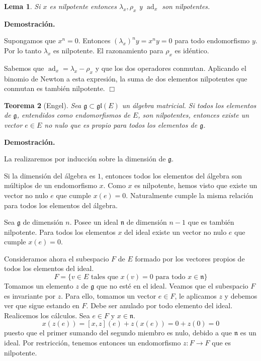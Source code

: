 \documentclass[a4paper,draft,12pt]{article}
\newtheorem{teo}{Teorema}[section]%
\newtheorem{lema}[teo]{Lema}%
\newcommand{\dem}{\noindent \textbf{Demostración. }\vspace{0.3 cm}}%
\newcommand{\g}{\mathfrak{g}}%
\newcommand{\fin}{ $\Box $ \vspace{0.4 cm}}
\DeclareMathOperator{\ad}{ad}  %
\begin{document}
\begin{lema}

Si $x$ es nilpotente entonces $\lambda_x, \rho_x$ y $ \ad_x$ son nilpotentes.

\end{lema}

\dem

Supongamos que $x^n=0$.  Entonces $(\lambda_x)^ny = x^ny =0$ para todo endomorfismo $y$.  Por lo tanto $\lambda_x$ es nilpotente.  El razonamiento para $\rho_x$ es idéntico.

Sabemos que $\ad_x = \lambda_x-\rho_x$ y que los dos operadores conmutan.  Aplicando el binomio de Newton a esta expresión, la suma de dos elementos nilpotentes que conmutan es también nilpotente. \fin

\begin{teo}[Engel]

Sea $\g \subset \mathfrak{gl}(E)$ un álgebra matricial.  Si todos los elementos de $\g$, entendidos como endomorfismos de $E$, son nilpotentes, entonces existe un vector $e  \in E$ no nulo que es propio para todos los elementos de $\g$.

\end{teo}


\dem

La realizaremos por inducción sobre la dimensión de $\g$.

Si la dimensión del álgebra es $1$, entonces todos los elementos del álgebra son múltiplos de un endomorfismo $x$.  Como $x$ es nilpotente, hemos visto que existe un vector no nulo $e$ que cumple $x(e)=0$.  Naturalmente cumple la misma relación para todos los elementos del álgebra.

Sea $\g$ de dimensión $n$.  Posee un ideal $\mathfrak{n}$ de dimensión $n-1$ que es también nilpotente.  Para todos los elementos $x$ del ideal existe un vector no nulo $e$ que cumple $x(e)=0$.  

Consideramos ahora el subespacio $F$ de $E$ formado por los vectores propios de todos los elementos del ideal.
$$
F= \{v \in E \text{ tales que } x(v)=0 \text{ para todo } x \in \mathfrak{n}\}
$$
Tomamos un elemento $z$ de $\g$ que no esté en el ideal.  Veamos que el subespacio $F$ es invariante por $z$.  Para ello, tomamos un vector $e \in F$, le aplicamos $z$ y debemos ver que sigue estando en $F$.  Debe ser  anulado por todo elemento del ideal.  Realicemos los cálculos.  Sea $e\in F$ y $x \in\mathfrak{n}$.
$$
x(z(e))=[x,z](e)+ z(x(e))=0+z(0)=0
$$
puesto que el primer sumando del segundo miembro es nulo, debido a  que $\mathfrak{n}$ es un ideal. Por restricción,  tenemos entonces un endomorfismo $z: F \rightarrow F$ que es nilpotente.
\end{document}
